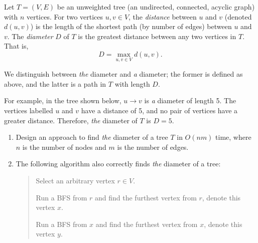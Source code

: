 \documentclass[12pt]{article}
\begin{document}

\begin{question}
Let $T = (V,E)$ be an unweighted tree (an undirected, connected, acyclic graph) with $n$ vertices. For two vertices $u,v \in V$, the \textit{distance} between $u$ and $v$ (denoted $d(u,v)$) is the length of the shortest path (by number of edges) between $u$ and $v$. The {\em diameter} $D$ of $T$ is the greatest distance between any two vertices in $T$. That is,
\[ D = \max_{u,v\in V} d(u,v). \]

We distinguish between {\em the} diameter and {\em a} diameter; the former is defined as above, and the latter is a path in $T$ with length $D$.

For example, in the tree shown below, $u \rightarrow v$ is {\em a} diameter of length 5. The vertices labelled $u$ and $v$ have a distance of 5, and no pair of vertices have a greater distance. Therefore, {\em the} diameter of $T$ is $D = 5.$
\begin{center}
\end{center}

\begin{enumerate}[label=(\alph*)]
    \item Design an approach to find {\em the} diameter of a tree $T$ in $O(nm)$ time, where $n$ is the number of nodes and $m$ is the number of edges.
    \item The following algorithm also correctly finds {\em the} diameter of a tree:
    \begin{quote}
        Select an arbitrary vertex $r \in V$. 
        
        Run a BFS from $r$ and find the furthest vertex from $r$, denote this vertex $x$. 
        
        Run a BFS from $x$ and find the furthest vertex from $x$, denote this vertex $y$. 
        

\end{quote}
\end{enumerate}
\end{question}
\end{document}
